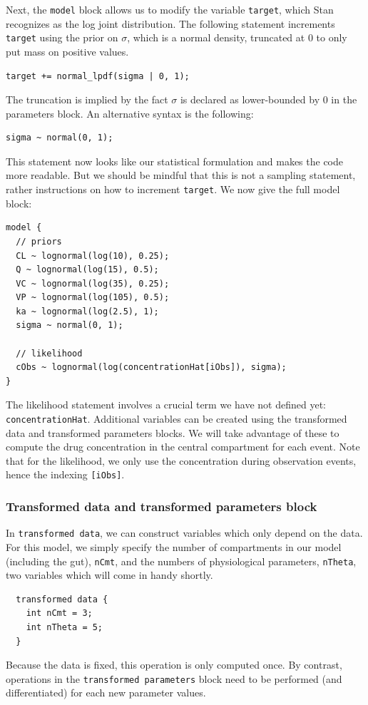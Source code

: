 Next, the \texttt{model} block allows us to modify the variable \texttt{target}, which Stan recognizes as the log joint distribution.
The following statement increments \texttt{target} using the prior on $\sigma$, which is a normal density, truncated at 0 to only put mass on positive values.
\begin{lstlisting}
target += normal_lpdf(sigma | 0, 1);
\end{lstlisting}
The truncation is implied by the fact $\sigma$ is declared as lower-bounded by 0 in the parameters block.
An alternative syntax is the following:
\begin{lstlisting}
sigma ~ normal(0, 1);
\end{lstlisting}
This statement now looks like our statistical formulation and makes the code more readable.
But we should be mindful that this is not a sampling statement, rather instructions on how to increment \texttt{target}.
We now give the full model block:
\begin{lstlisting}
model {
  // priors
  CL ~ lognormal(log(10), 0.25); 
  Q ~ lognormal(log(15), 0.5);
  VC ~ lognormal(log(35), 0.25);
  VP ~ lognormal(log(105), 0.5);
  ka ~ lognormal(log(2.5), 1);
  sigma ~ normal(0, 1);

  // likelihood
  cObs ~ lognormal(log(concentrationHat[iObs]), sigma);
}
\end{lstlisting}
%
The likelihood statement involves a crucial term we have not defined yet: \texttt{concentrationHat}.
Additional variables can be created using the transformed data and transformed parameters blocks.
We will take advantage of these to compute the drug concentration in the central compartment for each event.
Note that for the likelihood, we only use the concentration during observation events, hence the indexing \texttt{[iObs]}.

\subsubsection{Transformed data and transformed parameters block} \label{sec:twocpt_transformed_parameters}

In \texttt{transformed data}, we can construct variables which only depend on the data.
For this model, we simply specify the number of compartments in our model (including the gut), \texttt{nCmt}, and the numbers of physiological parameters, \texttt{nTheta}, two variables which will come in handy shortly.
\begin{lstlisting}
  transformed data {
    int nCmt = 3;
    int nTheta = 5; 
  }
\end{lstlisting}
%
Because the data is fixed, this operation is only computed once.
By contrast, operations in the \texttt{transformed parameters} block need to be performed (and differentiated) for each new parameter values.

